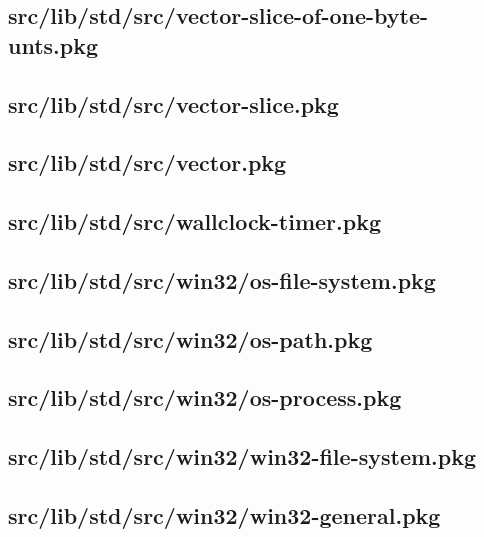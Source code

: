\subsection{src/lib/std/src/vector-slice-of-one-byte-unts.pkg}


\subsection{src/lib/std/src/vector-slice.pkg}


\subsection{src/lib/std/src/vector.pkg}


\subsection{src/lib/std/src/wallclock-timer.pkg}


\subsection{src/lib/std/src/win32/os-file-system.pkg}


\subsection{src/lib/std/src/win32/os-path.pkg}


\subsection{src/lib/std/src/win32/os-process.pkg}


\subsection{src/lib/std/src/win32/win32-file-system.pkg}


\subsection{src/lib/std/src/win32/win32-general.pkg}


